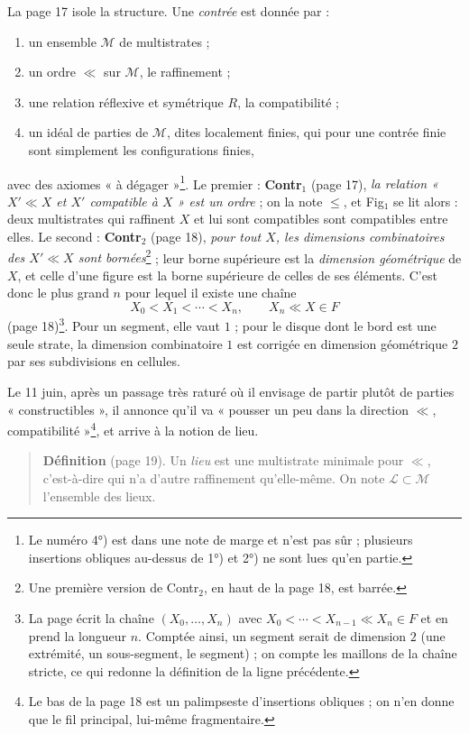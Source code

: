 \documentclass[11pt,a4paper]{article}
\begin{document}
La page 17 isole la structure. Une \emph{contrée} est donnée par :
\begin{enumerate}
\item[1°)] un ensemble $\mathcal{M}$ de multistrates ;
\item[2°)] un ordre $\ll$ sur $\mathcal{M}$, le raffinement ;
\item[3°)] une relation réflexive et symétrique $R$, la compatibilité ;
\item[4°)] un idéal de parties de $\mathcal{M}$, dites localement finies, qui
pour une contrée finie sont simplement les configurations finies,
\end{enumerate}
avec des axiomes « à dégager »\footnote{Le numéro 4°) est dans une note de marge
et n'est pas sûr ; plusieurs insertions obliques au-dessus de 1°) et 2°) ne sont
lues qu'en partie.}. Le premier : \textbf{Contr}$_{1}$ (page 17), \emph{la
relation « $X' \ll X$ et $X'$ compatible à $X$ » est un ordre} ; on la note
$\leq$, et Fig$_{1}$ se lit alors : deux multistrates qui raffinent $X$ et lui
sont compatibles sont compatibles entre elles. Le second :
\textbf{Contr}$_{2}$ (page 18), \emph{pour tout $X$, les dimensions
combinatoires des $X' \ll X$ sont bornées}\footnote{Une première version de
Contr$_{2}$, en haut de la page 18, est barrée.} ; leur borne supérieure est la
\emph{dimension géométrique} de $X$, et celle d'une figure est la borne
supérieure de celles de ses éléments. C'est donc le plus grand $n$ pour lequel
il existe une chaîne
\[
X_{0} < X_{1} < \cdots < X_{n}, \qquad X_{n} \ll X \in F
\]
(page 18)\footnote{La page écrit la chaîne $(X_{0}, \ldots, X_{n})$ avec $X_{0}
< \cdots < X_{n-1} \ll X_{n} \in F$ et en prend la longueur $n$. Comptée
ainsi, un segment serait de dimension $2$ (une extrémité, un sous-segment, le
segment) ; on compte les maillons de la chaîne stricte, ce qui redonne la
définition de la ligne précédente.}. Pour un segment, elle vaut $1$ ; pour
le disque dont le bord est une seule strate, la dimension combinatoire $1$ est
corrigée en dimension géométrique $2$ par ses subdivisions en cellules.

Le 11 juin, après un passage très raturé où il envisage de partir plutôt de
parties « constructibles », il annonce qu'il va « pousser un peu dans la
direction $\ll$, compatibilité »\footnote{Le bas de la page 18 est un palimpseste
d'insertions obliques ; on n'en donne que le fil principal, lui-même
fragmentaire.}, et arrive à la notion de lieu.

\begin{quote}
\textbf{Définition} (page 19). Un \emph{lieu} est une multistrate minimale pour
$\ll$, c'est-à-dire qui n'a d'autre raffinement qu'elle-même. On note
$\mathcal{L} \subset \mathcal{M}$ l'ensemble des lieux.
\end{quote}
\end{document}
